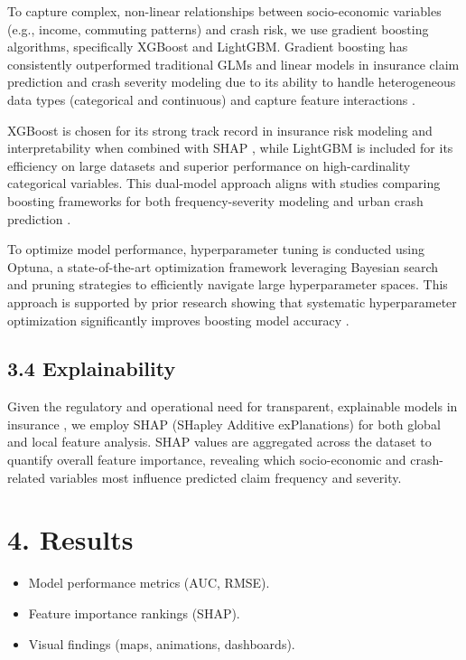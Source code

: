 \documentclass[
  number,
  review,
  3p]{elsarticle}
\providecommand{\tightlist}{%
  \setlength{\itemsep}{0pt}\setlength{\parskip}{0pt}}
\begin{document}
To capture complex, non-linear relationships between socio-economic
variables (e.g., income, commuting patterns) and crash risk, we use
gradient boosting algorithms, specifically XGBoost and LightGBM.
Gradient boosting has consistently outperformed traditional GLMs and
linear models in insurance claim prediction and crash severity modeling
due to its ability to handle heterogeneous data types (categorical and
continuous) and capture feature interactions
\citep[\citep{mohamed}]{clemente}.

XGBoost is chosen for its strong track record in insurance risk modeling
and interpretability when combined with SHAP \citep{dong}, while
LightGBM is included for its efficiency on large datasets and superior
performance on high-cardinality categorical variables. This dual-model
approach aligns with studies comparing boosting frameworks for both
frequency-severity modeling \citep{henckaerts} and urban crash
prediction \citep{adeniyi}.

To optimize model performance, hyperparameter tuning is conducted using
Optuna, a state-of-the-art optimization framework leveraging Bayesian
search and pruning strategies to efficiently navigate large
hyperparameter spaces. This approach is supported by prior research
showing that systematic hyperparameter optimization significantly
improves boosting model accuracy \citep[\citep{liu}]{dong}.

\subsection{3.4 Explainability}\label{explainability}

Given the regulatory and operational need for transparent, explainable
models in insurance \citep[\citep{lundberg}]{henckaerts}, we employ SHAP
(SHapley Additive exPlanations) for both global and local feature
analysis. SHAP values are aggregated across the dataset to quantify
overall feature importance, revealing which socio-economic and
crash-related variables most influence predicted claim frequency and
severity.

\section{4. Results}\label{results}

\begin{itemize}
\tightlist
\item
  Model performance metrics (AUC, RMSE).
\item
  Feature importance rankings (SHAP).
\item
  Visual findings (maps, animations, dashboards).
\end{itemize}
\end{document}
